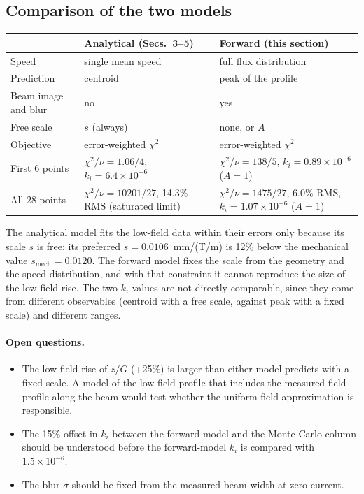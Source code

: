 \documentclass[11pt,a4paper]{article}
\newcommand{\kan}{k_i}
\begin{document}
\subsection{Comparison of the two models}
\begin{center}
\small
\begin{tabular}{l>{\raggedright\arraybackslash}p{5.2cm}>{\raggedright\arraybackslash}p{5.6cm}}
\toprule
 & Analytical (Secs.~3--5) & Forward (this section)\\
\midrule
Speed                 & single mean speed & full flux distribution\\
Prediction            & centroid           & peak of the profile\\
Beam image and blur   & no                 & yes\\
Free scale            & $s$ (always)       & none, or $A$\\
Objective             & error-weighted $\chi^2$ & error-weighted $\chi^2$\\
First 6 points        & $\chi^2/\nu = 1.06/4$, $\kan = 6.4\times10^{-6}$ & $\chi^2/\nu = 138/5$, $\kan = 0.89\times10^{-6}$ ($A=1$)\\
All 28 points         & $\chi^2/\nu = 10201/27$, 14.3\% RMS (saturated limit) & $\chi^2/\nu = 1475/27$, 6.0\% RMS, $\kan = 1.07\times10^{-6}$ ($A=1$)\\
\bottomrule
\end{tabular}
\end{center}
The analytical model fits the low-field data within their errors only because its scale $s$ is free; its preferred $s = 0.0106$~mm/(T/m) is 12\% below the mechanical value $s_\text{mech} = 0.0120$. The forward model fixes the scale from the geometry and the speed distribution, and with that constraint it cannot reproduce the size of the low-field rise. The two $\kan$ values are not directly comparable, since they come from different observables (centroid with a free scale, against peak with a fixed scale) and different ranges.

\paragraph{Open questions.}
\begin{itemize}
\item The low-field rise of $z/G$ (+25\%) is larger than either model predicts with a fixed scale. A model of the low-field profile that includes the measured field profile along the beam would test whether the uniform-field approximation is responsible.
\item The 15\% offset in $\kan$ between the forward model and the Monte Carlo column should be understood before the forward-model $\kan$ is compared with $1.5\times10^{-6}$.
\item The blur $\sigma$ should be fixed from the measured beam width at zero current.
\end{itemize}
\end{document}
